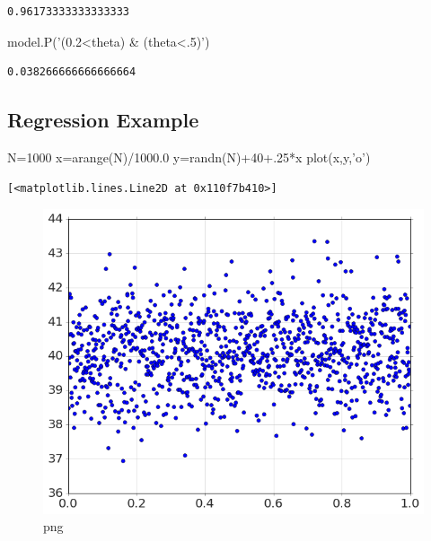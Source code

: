 \documentclass[]{article}
\newenvironment{Shaded}{}{}
\newcommand{\DecValTok}[1]{\textcolor[rgb]{0.25,0.63,0.44}{{#1}}}
\newcommand{\FloatTok}[1]{\textcolor[rgb]{0.25,0.63,0.44}{{#1}}}
\newcommand{\StringTok}[1]{\textcolor[rgb]{0.25,0.44,0.63}{{#1}}}
\newcommand{\NormalTok}[1]{{#1}}
\begin{document}
\begin{verbatim}
0.96173333333333333
\end{verbatim}

\begin{Shaded}
\begin{Highlighting}[]
\NormalTok{model.P(}\StringTok{'(0.2<theta) & (theta<.5)'}\NormalTok{)}
\end{Highlighting}
\end{Shaded}

\begin{verbatim}
0.038266666666666664
\end{verbatim}

\subsection{Regression Example}\label{regression-example}

\begin{Shaded}
\begin{Highlighting}[]
\NormalTok{N=}\DecValTok{1000}
\NormalTok{x=arange(N)/}\FloatTok{1000.0}
\NormalTok{y=randn(N)+}\DecValTok{40}\FloatTok{+.25}\NormalTok{*x}
\NormalTok{plot(x,y,}\StringTok{'o'}\NormalTok{)}
\end{Highlighting}
\end{Shaded}

\begin{verbatim}
[<matplotlib.lines.Line2D at 0x110f7b410>]
\end{verbatim}

\begin{figure}[htbp]
\centering
\includegraphics{output_15_1.png}
\caption{png}
\end{figure}
\end{document}
